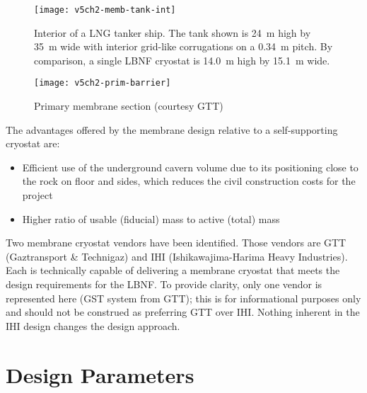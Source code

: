 \begin{figure}[htbp]
\centering
\texttt{[image: v5ch2-memb-tank-int]}
\caption[Interior of a LNG tanker ship]{Interior of a LNG tanker ship. 
The tank shown is 24~m high by 35~m wide with interior grid-like 
corrugations on a 0.34~m pitch. By comparison, a single LBNF 
cryostat is %
14.0~m high by 15.1~m wide.}
\label{fig:memb-tank-int}
\end{figure}

\begin{figure}[htbp]
\centering
\texttt{[image: v5ch2-prim-barrier]}
\caption[Primary membrane section]{Primary membrane section (courtesy GTT)}
\label{fig:prim-barrier}
\end{figure}

The advantages offered by the membrane design relative to a self-supporting cryostat are:
\begin{itemize}
\item Efficient use of the underground cavern volume due to its positioning 
close to the rock on floor and sides, which reduces the civil construction 
costs for the project
\item Higher ratio of usable (fiducial) mass to active (total) mass
\end{itemize}

Two membrane cryostat vendors have been 
identified. Those vendors are GTT (Gaztransport \& Technigaz) and 
IHI (Ishikawajima-Harima Heavy Industries). Each is technically capable 
of delivering a membrane cryostat that meets the design requirements for 
the LBNF. To provide clarity, only one vendor is represented here (GST 
system from GTT); this is for informational purposes only and should not 
be construed as preferring GTT over IHI. Nothing inherent in the IHI 
design changes the design approach. 


\section{Design Parameters}
\label{sec:cryo-cryosys-params}

